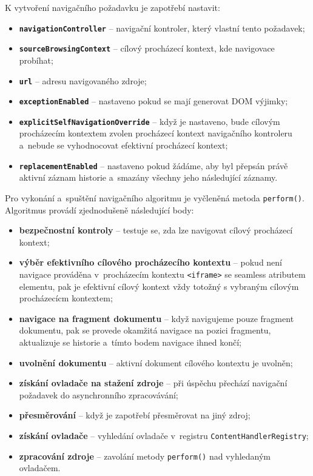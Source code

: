 \bigskip \noindent K vytvoření navigačního požadavku je zapotřebí nastavit:  

\begin{itemize}
  \item \textbf{\texttt{navigationController}} -- navigační kontroler, který vlastní tento požadavek;
  \item \textbf{\texttt{sourceBrowsingContext}} -- cílový procházecí kontext, kde navigovace probíhat;
  \item \textbf{\texttt{url}} -- adresu navigovaného zdroje;
  \item \textbf{\texttt{exceptionEnabled}} -- nastaveno pokud se mají generovat DOM výjimky;
  \item \textbf{\texttt{explicitSelfNavigationOverride}} -- když je nastaveno, bude cílovým procházecím kontextem zvolen procházecí kontext navigačního kontroleru a~nebude se vyhodnocovat efektivní procházecí kontext;
  \item \textbf{\texttt{replacementEnabled}} -- nastaveno pokud žádáme, aby byl přepsán právě aktivní záznam historie a~smazány všechny jeho následující záznamy.
\end{itemize}

Pro vykonání a~spuštění navigačního algoritmu je vyčleněná metoda \texttt{perform()}. Algoritmus provádí zjednodušeně následující body:

\begin{itemize}
  \item \textbf{bezpečnostní kontroly} -- testuje se, zda lze navigovat cílový procházecí kontext;
  \item \textbf{výběr efektivního cílového procházecího kontextu} -- pokud není navigace prováděna v~procházecím kontextu \texttt{<iframe>} se seamless atributem elementu, pak je efektivní cílový kontext vždy totožný s vybraným cílovým procházecícm kontextem;
  \item \textbf{navigace na fragment dokumentu} -- když navigujeme pouze fragment dokumentu, pak se provede okamžitá navigace na pozici fragmentu, aktualizuje se historie a~tímto bodem navigace ihned končí; 
  \item \textbf{uvolnění dokumentu} -- aktivní dokument cílového kontextu je uvolněn;
  \item \textbf{získání ovladače na stažení zdroje} -- při úspěchu přechází navigační požadavek do asynchronního zpracovávání;
  \item \textbf{přesměrování} -- když je zapotřebí přesměrovat na jiný zdroj;
  \item \textbf{získání ovladače} -- vyhledání ovladače v~registru \texttt{ContentHandlerRegistry}; 
  \item \textbf{zpracování zdroje} -- zavolání metody \texttt{perform()} nad vyhledaným ovladačem.
\end{itemize}

